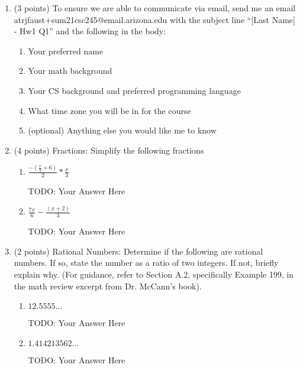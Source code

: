\documentclass{article}
\begin{document}
\begin{enumerate}
    \item   {\large (3 points) To ensure we are able to communicate via email, send me an email at\newline rjfaust+sum21csc245@email.arizona.edu with the subject line ``[Last Name] - Hw1 Q1'' and the following in the body:} 
    \begin{enumerate}
        \item Your preferred name 
        \item Your math background
        \item Your CS background and preferred programming language
        \item What time zone you will be in for the course
        \item (optional) Anything else you would like me to know
    \end{enumerate}

    \item {\large (4 points) Fractions: Simplify the following fractions} 
    \begin{enumerate}
        \item $\frac{-(\frac{x}{3}+6)}{2}* \frac{x}{3}$
        
        {\color{red} TODO: Your Answer Here}
        
        \item $\frac{7x}{6} - \frac{(x+2)}{3}$
     
        {\color{red} TODO: Your Answer Here}
        
    \end{enumerate}

    \item  {\large (2 points) Rational Numbers: Determine if the following are rational numbers. If so, state the number as a ratio of two integers.  If not, briefly explain why. (For guidance, refer to Section A.2, specifically Example 199, in the math review excerpt from Dr. McCann's book).} 
    \begin{enumerate}
        \item $12.5555\dots$
             
        {\color{red} TODO: Your Answer Here}
        
        \item $1.414213562\dots$
             
        {\color{red} TODO: Your Answer Here}
        
    \end{enumerate}


\end{enumerate}
\end{document}
